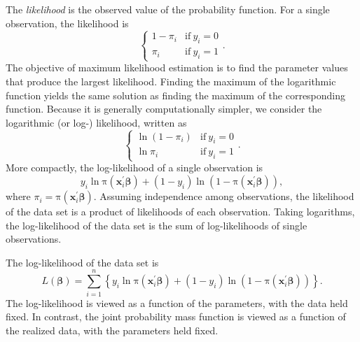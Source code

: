 
The \emph{likelihood }is the observed value of the probability
function. For a single observation, the likelihood is
\begin{equation*}
\left\{
\begin{array}{ll}
1-\pi_i & \mathrm{if}\ y_i=0 \\
\pi_i & \mathrm{if}\ y_i=1
\end{array}
\right. .
\end{equation*}
The objective of maximum likelihood estimation is to find the
parameter values that produce the largest likelihood. Finding the
maximum of the logarithmic function yields the same solution as
finding the maximum of the corresponding function. Because it is
generally computationally simpler, we consider the logarithmic (or
log-) likelihood, written as
\begin{equation}\label{E11:LogLikBin}
\left\{
\begin{array}{ll}
\ln \left( 1-\pi_i\right) & \mathrm{if}\ y_i=0 \\
\ln \pi_i & \mathrm{if}\ y_i=1
\end{array}
\right. .
\end{equation}
More compactly, the log-likelihood of a single observation is
\begin{equation*}
y_i\ln \mathrm{\pi }(\mathbf{x}_i^{\mathbf{\prime}}\boldsymbol
\beta) + (1-y_i) \ln \left( 1-\mathrm{\pi }(\mathbf{x}_i^{\mathbf{\prime}}%
\boldsymbol \beta)\right) ,
\end{equation*}
where $\pi_i=\mathrm{\pi }(\mathbf{x}_i^{\mathbf{\prime}}\boldsymbol \beta%
). $ Assuming independence among observations, the likelihood of the data
set is a product of likelihoods of each observation. Taking logarithms, the
log-likelihood of the data set is the sum of log-likelihoods of single
observations.



\bigskip

\boxedjed{}

The log-likelihood of the data set is
\begin{equation}\label{E11:LogLike}
L(\boldsymbol \beta)=\sum\limits_{i=1}^{n}\left\{ y_i\ln \mathrm{\pi
}( \mathbf{x}_i^{\mathbf{\prime}}\boldsymbol \beta) + (1-y_i) \ln
\left( 1- \mathrm{\pi }(\mathbf{x}_i^{\mathbf{\prime}}\boldsymbol
\beta)\right) \right\} .
\end{equation}
The log-likelihood is viewed as a function of the parameters, with
the data held fixed. In contrast, the joint probability mass
function is viewed as a function of the realized data, with the
parameters held fixed.

